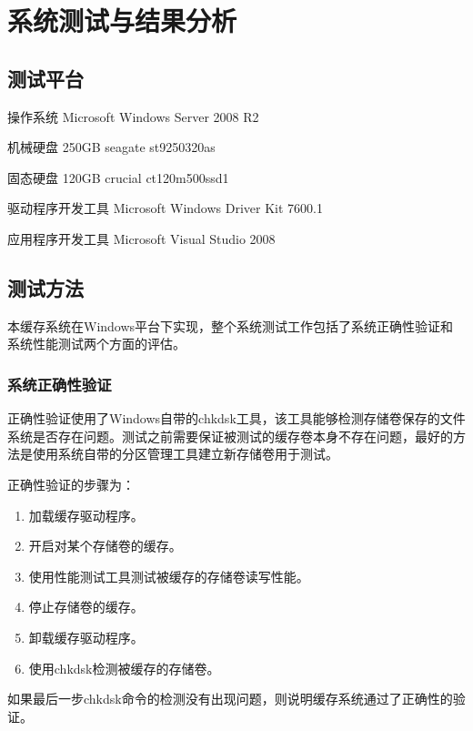 
\chapter{系统测试与结果分析}
\label{cha:exp_analysis}

\section{测试平台}
\label{sec:exp_platform}

操作系统 Microsoft Windows Server 2008 R2

机械硬盘 250GB seagate st9250320as

固态硬盘 120GB crucial ct120m500ssd1

驱动程序开发工具 Microsoft Windows Driver Kit 7600.1

应用程序开发工具 Microsoft Visual Studio 2008

\section{测试方法}
\label{sec:exp_method}

本缓存系统在Windows平台下实现，整个系统测试工作包括了系统正确性验证和系统性能测试两个方面的评估。

\subsection{系统正确性验证}

正确性验证使用了Windows自带的chkdsk工具，该工具能够检测存储卷保存的文件系统是否存在问题。测试之前需要保证被测试的缓存卷本身不存在问题，最好的方法是使用系统自带的分区管理工具建立新存储卷用于测试。

正确性验证的步骤为：
\begin{enumerate}
\item 加载缓存驱动程序。
\item 开启对某个存储卷的缓存。
\item 使用性能测试工具测试被缓存的存储卷读写性能。
\item 停止存储卷的缓存。
\item 卸载缓存驱动程序。
\item 使用chkdsk检测被缓存的存储卷。
\end{enumerate}

如果最后一步chkdsk命令的检测没有出现问题，则说明缓存系统通过了正确性的验证。

